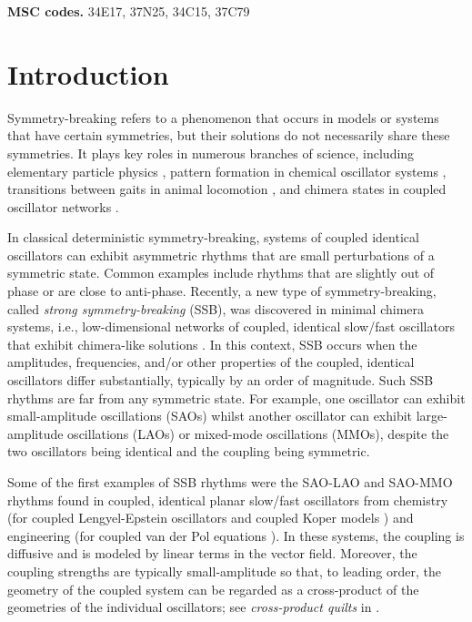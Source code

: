 \documentclass[10pt,onecolumn]{article}
\theoremstyle{plain}
\begin{document}
\noindent
{\bf MSC codes.}  
34E17, %
37N25, %
34C15, %
37C79 %



\section{Introduction} \label{sec:intro}
Symmetry-breaking refers to a phenomenon that occurs in models or systems that have certain symmetries, but their solutions do not necessarily share these symmetries. It plays key roles in numerous branches of science, including elementary particle physics \cite{Gross1996}, pattern formation in chemical oscillator systems \cite{Mainzer1997}, transitions between gaits in animal locomotion \cite{Collins1993}, and chimera states in coupled oscillator networks \cite{Abrams2004,Kuramoto2002}.  

In classical deterministic symmetry-breaking, systems of coupled identical oscillators can exhibit asymmetric rhythms that are small perturbations of a symmetric state. Common examples include rhythms that are slightly out of phase or are close to anti-phase. 
Recently, a new type of symmetry-breaking, called {\em strong symmetry-breaking} (SSB), was discovered in minimal chimera systems, i.e., low-dimensional networks of coupled, identical slow/fast oscillators that exhibit chimera-like solutions \cite{Awal2023,Awal2024,Epstein2024}. In this context, SSB occurs when the amplitudes, frequencies, and/or other properties of the coupled, identical oscillators differ substantially, typically by an order of magnitude. Such SSB rhythms are far from any symmetric state. For example, one oscillator can exhibit small-amplitude oscillations (SAOs) whilst another oscillator can exhibit large-amplitude oscillations (LAOs) or mixed-mode oscillations (MMOs), despite the two oscillators being identical and the coupling being symmetric.  

Some of the first examples of SSB rhythms were the SAO-LAO and SAO-MMO rhythms found in coupled, identical planar slow/fast oscillators from chemistry (for coupled Lengyel-Epstein oscillators \cite{Awal2019,Awal2024} and coupled Koper models \cite{Epstein2024}) and engineering (for coupled van der Pol equations \cite{Awal2023}). In these systems, the coupling is diffusive and is modeled by linear terms in the vector field.  Moreover, the coupling strengths are typically small-amplitude so that, to leading order, the geometry of the coupled system can be regarded as a cross-product of the geometries of the individual oscillators; see {\em cross-product quilts} in \cite{Awal2023}.
\end{document}

